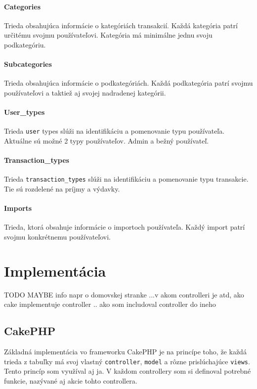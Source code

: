 \documentclass[12pt,oneside]{book}
\begin{document}
\subsubsection{Categories}
Trieda obsahujúca informácie o kategóriách transakcií. Každá kategória patrí určitému svojmu používateľovi. Kategória má minimálne jednu svoju podkategóriu.
\subsubsection{Subcategories}
Trieda obsahujúca informácie o podkategóriách. Každá podkategória patrí svojmu používateľovi a taktiež aj svojej nadradenej kategórii.
\subsubsection{User\_types}
Trieda \texttt{user} types slúži na identifikáciu a pomenovanie typu používateľa. Aktuálne sú možné 2 typy používateľov. Admin a bežný používateľ.
\subsubsection{Transaction\_types}
Trieda \texttt{transaction\_types} slúži na identifikáciu a pomenovanie typu transakcie. Tie sú rozdelené na príjmy a výdavky.
\subsubsection{Imports}
Trieda, ktorá obsahuje informácie o importoch používateľa. Každý import patrí svojmu konkrétnemu používateľovi.



\chapter{Implementácia}

TODO MAYBE
info napr o domovskej stranke ...v akom controlleri je atd, ako cake implementuje controller .. ako som includoval controller do ineho

\section{CakePHP}
Základná implementácia vo frameworku CakePHP je na princípe toho, že každá trieda z tabuľky má svoj vlastný \texttt{controller}, \texttt{model} a rôzne prislúchajúce \texttt{views}. Tento princíp som využíval aj ja. V každom controllery som si definoval potrebné funkcie, nazývané aj akcie tohto controllera. 
\end{document}
